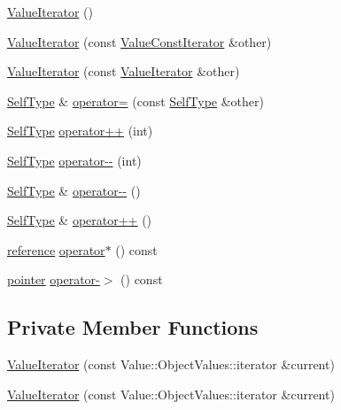 \begin{DoxyCompactItemize}
\item 
\hyperlink{class_json_1_1_value_iterator_a09425cf4dc12244072a942f290a5c0ec}{Value\+Iterator} ()
\item 
\hyperlink{class_json_1_1_value_iterator_aa85aa208670891670392259efa0143bb}{Value\+Iterator} (const \hyperlink{class_json_1_1_value_const_iterator}{Value\+Const\+Iterator} \&other)
\item 
\hyperlink{class_json_1_1_value_iterator_a7d5e58a9a4a553968acdf3064b39d21c}{Value\+Iterator} (const \hyperlink{class_json_1_1_value_iterator}{Value\+Iterator} \&other)
\item 
\hyperlink{class_json_1_1_value_iterator_base_a9d2a940d03ea06d20d972f41a89149ee}{Self\+Type} \& \hyperlink{class_json_1_1_value_iterator_a263912ab48a278202312cfddf636bc71}{operator=} (const \hyperlink{class_json_1_1_value_iterator_base_a9d2a940d03ea06d20d972f41a89149ee}{Self\+Type} \&other)
\item 
\hyperlink{class_json_1_1_value_iterator_base_a9d2a940d03ea06d20d972f41a89149ee}{Self\+Type} \hyperlink{class_json_1_1_value_iterator_abcf4ddd994a010742cd4a436d65acd08}{operator++} (int)
\item 
\hyperlink{class_json_1_1_value_iterator_base_a9d2a940d03ea06d20d972f41a89149ee}{Self\+Type} \hyperlink{class_json_1_1_value_iterator_a06d6a29d96caf6af324a53973159e12b}{operator-\/-\/} (int)
\item 
\hyperlink{class_json_1_1_value_iterator_base_a9d2a940d03ea06d20d972f41a89149ee}{Self\+Type} \& \hyperlink{class_json_1_1_value_iterator_a811302a868518a0995a9def955df5720}{operator-\/-\/} ()
\item 
\hyperlink{class_json_1_1_value_iterator_base_a9d2a940d03ea06d20d972f41a89149ee}{Self\+Type} \& \hyperlink{class_json_1_1_value_iterator_a92146c46f8249e2b2d12869e70cd4cee}{operator++} ()
\item 
\hyperlink{class_json_1_1_value_iterator_ae87929b4567aa00372cf602c43b57160}{reference} \hyperlink{class_json_1_1_value_iterator_a3be48b0c1729ec2532f1ff27ad465d32}{operator$\ast$} () const
\item 
\hyperlink{class_json_1_1_value_iterator_acec45feb1ef1f3bf81240157d06d5432}{pointer} \hyperlink{class_json_1_1_value_iterator_a8dfc1603f92467591d524d0326f35534}{operator-\/$>$} () const
\end{DoxyCompactItemize}
\subsection*{Private Member Functions}
\begin{DoxyCompactItemize}
\item 
\hyperlink{class_json_1_1_value_iterator_afb06ea21add440c78c27dc49570460a5}{Value\+Iterator} (const Value\+::\+Object\+Values\+::iterator \&current)
\item 
\hyperlink{class_json_1_1_value_iterator_afb06ea21add440c78c27dc49570460a5}{Value\+Iterator} (const Value\+::\+Object\+Values\+::iterator \&current)
\end{DoxyCompactItemize}
